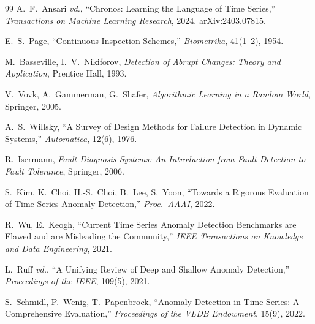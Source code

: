 \documentclass[11pt,a4paper]{article}
\newcommand{\etal}{\emph{vd.}}
\begin{document}
\begin{thebibliography}{99}
A.~F.~Ansari \etal{},
``Chronos: Learning the Language of Time Series,''
\emph{Transactions on Machine Learning Research}, 2024. arXiv:2403.07815.

E.~S.~Page, ``Continuous Inspection Schemes,''
\emph{Biometrika}, 41(1--2), 1954.

M.~Basseville, I.~V.~Nikiforov,
\emph{Detection of Abrupt Changes: Theory and Application},
Prentice Hall, 1993.

V.~Vovk, A.~Gammerman, G.~Shafer,
\emph{Algorithmic Learning in a Random World}, Springer, 2005.

A.~S.~Willsky,
``A Survey of Design Methods for Failure Detection in Dynamic Systems,''
\emph{Automatica}, 12(6), 1976.

R.~Isermann, \emph{Fault-Diagnosis Systems: An Introduction from Fault
Detection to Fault Tolerance}, Springer, 2006.

S.~Kim, K.~Choi, H.-S.~Choi, B.~Lee, S.~Yoon,
``Towards a Rigorous Evaluation of Time-Series Anomaly Detection,''
\emph{Proc.\ AAAI}, 2022.

R.~Wu, E.~Keogh,
``Current Time Series Anomaly Detection Benchmarks are Flawed and are
Misleading the Community,''
\emph{IEEE Transactions on Knowledge and Data Engineering}, 2021.

L.~Ruff \etal{},
``A Unifying Review of Deep and Shallow Anomaly Detection,''
\emph{Proceedings of the IEEE}, 109(5), 2021.

S.~Schmidl, P.~Wenig, T.~Papenbrock,
``Anomaly Detection in Time Series: A Comprehensive Evaluation,''
\emph{Proceedings of the VLDB Endowment}, 15(9), 2022.

\end{thebibliography}
\end{document}
